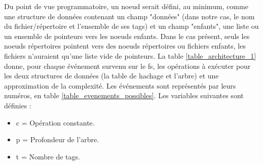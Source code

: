 Du point de vue programmatoire, un noeud serait défini, au minimum, comme une structure de données 
contenant un champ "données" (dans notre cas, le nom du fichier/répertoire et l'ensemble de ses tags) 
et un champ "enfants", une liste ou un ensemble de pointeurs vers les noeuds enfants. Dans le cas 
présent, seuls les noeuds répertoires pointent vers des noeuds répertoires ou fichiers enfants, 
les fichiers n'auraient qu'une liste vide de pointeurs.
\bigbreak
La table \ref{table_architecture_1} donne, pour chaque événement survenu sur le \acrshort{fs}, les opérations 
à exécuter pour les deux structures de données (la table de hachage et l'arbre) et une approximation 
de la complexité. Les événements sont représentés par leurs numéros, en table 
\ref{table_evenements_possibles}. Les variables suivantes sont définies :
\begin{itemize}
    \item c = Opération constante.
    \item p = Profondeur de l'arbre.
    \item t = Nombre de tags.
\end{itemize}
